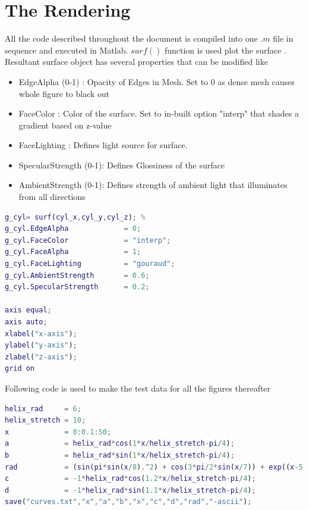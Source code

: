 \documentclass[a4paper]{article}
\begin{document}
\newpage
\hypertarget{the-rendering}{%
\section{ The Rendering}\label{the-rendering}}
All the code described throughout the document is compiled into one \(.m\) file in sequence and executed in Matlab. \(surf()\) function is used plot the surface \cite{mathworks_surf}. Resultant surface object has several properties that can be modified like \cite{mathworks_surface_properties}
\begin{itemize}
    \item EdgeAlpha (0-1) : Opacity of Edges in Mesh. Set to 0 as dense mesh causes whole figure to black out
    \item FaceColor : Color of the surface. Set to in-built option "interp" that shades a gradient based on z-value
    \item FaceLighting : Defines light source for surface.
    \item SpecularStrength (0-1): Defines Glossiness of the surface
    \item AmbientStrength (0-1): Defines strength of ambient light that illuminates from all directions
\end{itemize}
\begin{lstlisting}[language=matlab]
g_cyl= surf(cyl_x,cyl_y,cyl_z); % 
g_cyl.EdgeAlpha             = 0;
g_cyl.FaceColor             = "interp";
g_cyl.FaceAlpha             = 1;
g_cyl.FaceLighting          = "gouraud";
g_cyl.AmbientStrength       = 0.6;
g_cyl.SpecularStrength      = 0.2;

axis equal;
axis auto;
xlabel("x-axis");
ylabel("y-axis");
zlabel("z-axis");
grid on
\end{lstlisting}

Following code is used to make the test data for all the figures thereafter
\begin{lstlisting}[language=matlab]
helix_rad     = 6;
helix_stretch = 10;
x             = 0:0.1:50;
a             = helix_rad*cos(1*x/helix_stretch-pi/4);
b             = helix_rad*sin(1*x/helix_stretch-pi/4);
rad           = (sin(pi*sin(x/8).^2) + cos(3*pi/2*sin(x/7)) + exp((x-5)/35)) + 1;
c             = -1*helix_rad*cos(1.2*x/helix_stretch-pi/4);
d             = -1*helix_rad*sin(1.1*x/helix_stretch-pi/4);
save("curves.txt","x","a","b","x","c","d","rad","-ascii");

\end{lstlisting}
\end{document}
